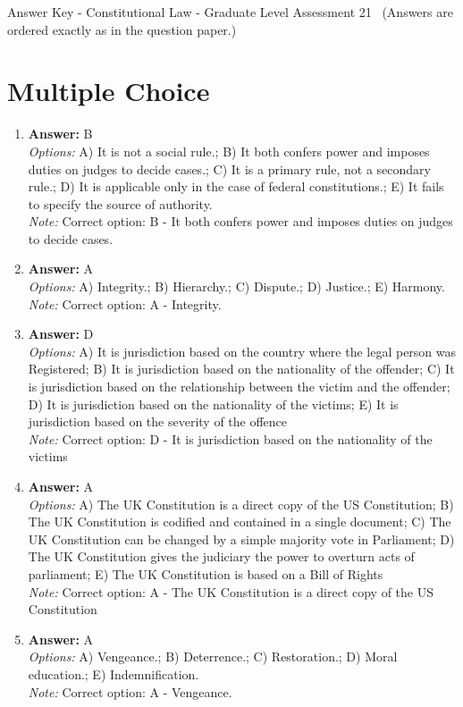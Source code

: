 \documentclass[12pt]{article}
\begin{document}
\begin{center}
Answer Key - Constitutional Law - Graduate Level Assessment 21 \
\small (Answers are ordered exactly as in the question paper.)
\end{center}

\section*{Multiple Choice}
\begin{enumerate}[label=\arabic*.]
\item \textbf{Answer:} B
\\ \textit{Options:} A) It is not a social rule.; B) It both confers power and imposes duties on judges to decide cases.; C) It is a primary rule, not a secondary rule.; D) It is applicable only in the case of federal constitutions.; E) It fails to specify the source of authority.
\\ \textit{Note:} Correct option: B - It both confers power and imposes duties on judges to decide cases.
\item \textbf{Answer:} A
\\ \textit{Options:} A) Integrity.; B) Hierarchy.; C) Dispute.; D) Justice.; E) Harmony.
\\ \textit{Note:} Correct option: A - Integrity.
\item \textbf{Answer:} D
\\ \textit{Options:} A) It is jurisdiction based on the country where the legal person was Registered; B) It is jurisdiction based on the nationality of the offender; C) It is jurisdiction based on the relationship between the victim and the offender; D) It is jurisdiction based on the nationality of the victims; E) It is jurisdiction based on the severity of the offence
\\ \textit{Note:} Correct option: D - It is jurisdiction based on the nationality of the victims
\item \textbf{Answer:} A
\\ \textit{Options:} A) The UK Constitution is a direct copy of the US Constitution; B) The UK Constitution is codified and contained in a single document; C) The UK Constitution can be changed by a simple majority vote in Parliament; D) The UK Constitution gives the judiciary the power to overturn acts of parliament; E) The UK Constitution is based on a Bill of Rights
\\ \textit{Note:} Correct option: A - The UK Constitution is a direct copy of the US Constitution
\item \textbf{Answer:} A
\\ \textit{Options:} A) Vengeance.; B) Deterrence.; C) Restoration.; D) Moral education.; E) Indemnification.
\\ \textit{Note:} Correct option: A - Vengeance.
\end{enumerate}
\end{document}
